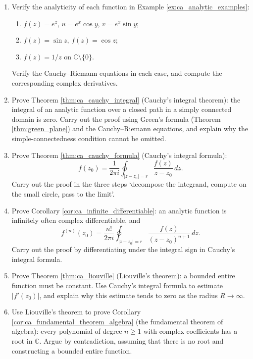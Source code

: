 \begin{enumerate}[leftmargin=3em, label=\textbf{Exercise \arabic*}]
    \item Verify the analyticity of each function in Example \ref{ex:ca_analytic_examples}:
    \begin{enumerate}[label=(\roman*)]
        \item $f(z)=e^z$, $u=e^x\cos y$, $v=e^x\sin y$;
        \item $f(z)=\sin z$, $f(z)=\cos z$;
        \item $f(z)=1/z$ on $\mathbb{C}\setminus\{0\}$.
    \end{enumerate}
    Verify the Cauchy--Riemann equations in each case,
    and compute the corresponding complex derivatives.

    \item Prove Theorem \ref{thm:ca_cauchy_integral} (Cauchy's integral theorem):
    the integral of an analytic function over a closed path in a simply connected domain is zero.
    Carry out the proof using Green's formula (Theorem \ref{thm:green_plane}) and the
    Cauchy--Riemann equations,
    and explain why the simple-connectedness condition cannot be omitted.

    \item Prove Theorem \ref{thm:ca_cauchy_formula} (Cauchy's integral formula):
    \[
    f(z_0)=\frac{1}{2\pi i}\oint_{|z-z_0|=r}
    \frac{f(z)}{z-z_0}\,dz.
    \]
    Carry out the proof in the three steps `decompose the integrand, compute on the small circle, pass to the limit'.

    \item Prove Corollary \ref{cor:ca_infinite_differentiable}:
    an analytic function is infinitely often complex differentiable, and
    \[
    f^{(n)}(z_0)=\frac{n!}{2\pi i}\oint_{|z-z_0|=r}
    \frac{f(z)}{(z-z_0)^{n+1}}\,dz.
    \]
    Carry out the proof by differentiating under the integral sign in Cauchy's integral formula.

    \item Prove Theorem \ref{thm:ca_liouville} (Liouville's theorem):
    a bounded entire function must be constant.
    Use Cauchy's integral formula to estimate $|f'(z_0)|$,
    and explain why this estimate tends to zero as the radius $R\to\infty$.

    \item Use Liouville's theorem to prove Corollary \ref{cor:ca_fundamental_theorem_algebra}
    (the fundamental theorem of algebra):
    every polynomial of degree $n\ge 1$ with complex coefficients has a root in $\mathbb{C}$.
    Argue by contradiction, assuming that there is no root and constructing a bounded entire function.


\end{enumerate}
